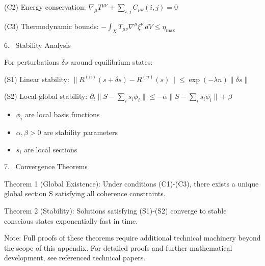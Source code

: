 (C2) Energy conservation:
$\nabla_\mu T^{\mu\nu} + \sum_{i,j} C_{\mu\nu}(i,j) = 0$

(C3) Thermodynamic bounds:
$-\int_X T_{\mu\nu}\nabla^\mu\xi^\nu \,dV \leq \eta_{\text{max}}$

6.~ Stability Analysis

For perturbations $\delta s$ around equilibrium states:

(S1) Linear stability:
$\|R^{(n)}(s + \delta s) - R^{(n)}(s)\| \leq \exp(-\lambda n)\|\delta s\|$

(S2) Local-global stability:
$\partial_t\|S - \sum_i s_i\phi_i\| \leq -\alpha\|S - \sum_i s_i\phi_i\| + \beta$

\begin{itemize}
  \item $\phi_i$ are local basis functions
  \item $\alpha,\beta > 0$ are stability parameters
  \item $s_i$ are local sections
\end{itemize}

7.~ Convergence Theorems

Theorem 1 (Global Existence): Under conditions (C1)-(C3), there exists a unique global section S satisfying all coherence constraints.

Theorem 2 (Stability): Solutions satisfying (S1)-(S2) converge to stable~ conscious states exponentially fast in time.

Note: Full proofs of these theorems require additional technical machinery beyond the scope of this appendix. For detailed proofs and further mathematical development, see referenced technical papers.

